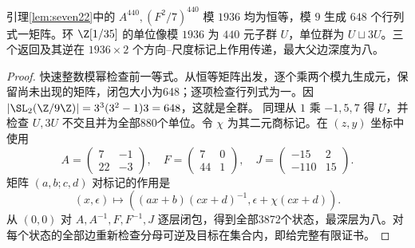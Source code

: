 \begin{proposition}[二十二元有限轨道证书]\label{prop:seven-certificate}
引理\ref{lem:seven22}中的 $A^{440},(F^2/7)^{440}$ 模 $1936$ 均为恒等，模 $9$ 生成 $648$ 个行列式一矩阵。环 $\Z[1/35]$ 的单位像模 $1936$ 为 $440$ 元子群 $U$，单位群为 $U\sqcup3U$。三个返回及其逆在 $1936\times2$ 个方向--尺度标记上作用传递，最大父边深度为八。
\end{proposition}
\begin{proof}
快速整数模幂检查前一等式。从恒等矩阵出发，逐个乘两个模九生成元，保留尚未出现的矩阵，闭包大小为648；逐项检查行列式为一。因 $|\SL_2(\Z/9\Z)|=3^3(3^2-1)3=648$，这就是全群。
同理从 $1$ 乘 $-1,5,7$ 得 $U$，并检查 $U,3U$ 不交且并为全部880个单位。令 $\chi$ 为其二元商标记。在 $(z,y)$ 坐标中使用
\[
A=\begin{pmatrix}7&-1\\22&-3\end{pmatrix},\quad
F=\begin{pmatrix}7&0\\44&1\end{pmatrix},\quad
J=\begin{pmatrix}-15&2\\-110&15\end{pmatrix}.
\]
矩阵 $(a,b;c,d)$ 对标记的作用是
\[
(x,\epsilon)\longmapsto((ax+b)(cx+d)^{-1},\epsilon+\chi(cx+d)).
\]
从 $(0,0)$ 对 $A,A^{-1},F,F^{-1},J$ 逐层闭包，得到全部3872个状态，最深层为八。对每个状态的全部边重新检查分母可逆及目标在集合内，即给完整有限证书。
\end{proof}

